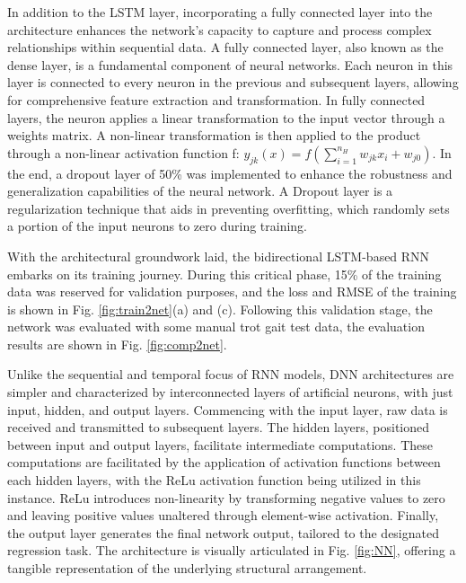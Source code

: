 In addition to the \ac{LSTM} layer, incorporating a fully connected layer into the architecture enhances the network's capacity to capture and process complex relationships within sequential data. A fully connected layer, also known as the dense layer, is a fundamental component of neural networks. Each neuron in this layer is connected to every neuron in the previous and subsequent layers, allowing for comprehensive feature extraction and transformation. In fully connected layers, the neuron applies a linear transformation to the input vector through a weights matrix. A non-linear transformation is then applied to the product through a non-linear activation function f: $y_{jk}(x)=f\left(\sum_{i=1}^{n_H} w_{j k} x_i+w_{j0}\right)$. In the end, a dropout layer of 50\% was implemented to enhance the robustness and generalization capabilities of the neural network. A Dropout layer is a regularization technique that aids in preventing overfitting, which randomly sets a portion of the input neurons to zero during training. 


With the architectural groundwork laid, the bidirectional \ac{LSTM}-based \ac{RNN} embarks on its training journey. During this critical phase, 15\% of the training data was reserved for validation purposes, and the loss and \ac{RMSE} of the training is shown in Fig. \ref{fig:train2net}(a) and (c). Following this validation stage, the network was evaluated with some manual trot gait test data, the evaluation results are shown in Fig. \ref{fig:comp2net}. 

Unlike the sequential and temporal focus of \ac{RNN} models, \ac{DNN} architectures are simpler and characterized by interconnected layers of artificial neurons, with just input, hidden, and output layers. Commencing with the input layer, raw data is received and transmitted to subsequent layers. The hidden layers, positioned between input and output layers, facilitate intermediate computations. These computations are facilitated by the application of activation functions between each hidden layers, with the \ac{ReLu} activation function being utilized in this instance. \ac{ReLu} introduces non-linearity by transforming negative values to zero and leaving positive values unaltered through element-wise activation. Finally, the output layer generates the final network output, tailored to the designated regression task. The architecture is visually articulated in Fig. \ref{fig:NN}, offering a tangible representation of the underlying structural arrangement. 

